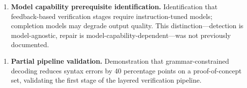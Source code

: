 \begin{enumerate}
\item \textbf{Model capability prerequisite identification.} Identification that feedback-based verification stages require instruction-tuned models; completion models may degrade output quality. This distinction---detection is model-agnostic, repair is model-capability-dependent---was not previously documented.
\end{enumerate}

\begin{enumerate}
\item \textbf{Partial pipeline validation.} Demonstration that grammar-constrained decoding reduces syntax errors by 40 percentage points on a proof-of-concept set, validating the first stage of the layered verification pipeline.
\end{enumerate}
